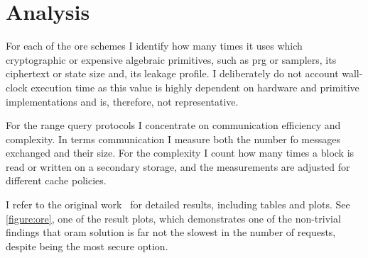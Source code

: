 	\section{Analysis}

		For each of the \gls{ore} schemes I identify how many times it uses which cryptographic or expensive algebraic primitives, such as \gls{prg} or samplers, its ciphertext or state size and, its leakage profile.
		I deliberately do not account wall-clock execution time as this value is highly dependent on hardware and primitive implementations and is, therefore, not representative.

		For the range query protocols I concentrate on communication efficiency and \IO{} complexity.
		In terms communication I measure both the number fo messages exchanged and their size.
		For the \IO{} complexity I count how many times a block is read or written on a secondary storage, and the measurements are adjusted for different cache policies.

		

		I refer to the original work~\cite{ore-benchmark-17} for detailed results, including tables and plots.
		See \cref{figure:ore}, one of the result plots, which demonstrates one of the non-trivial findings that \gls{oram} solution is far not the slowest in the number of \IO{} requests, despite being the most secure option.
